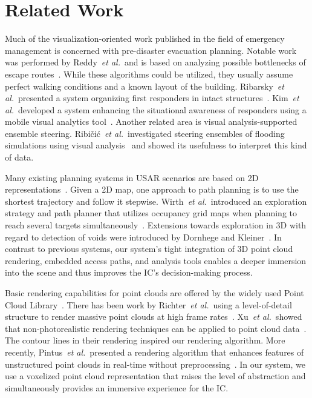 \documentclass[conference,10pt,letter]{IEEEtran}
\def\IC{IC}
\def\etal{\textit{et al.}}
\begin{document}

\section{Related Work} \label{sec:relatedwork}
 Much of the visualization-oriented work published in the field of emergency management is concerned with pre-disaster evacuation planning. Notable work was performed by Reddy~\etal\ and is based on analyzing possible bottlenecks of escape routes~\cite{EuroVA12:13-17:2012}. While these algorithms could be utilized, they usually assume perfect walking conditions and a known layout of the building. Ribarsky~\etal\ presented a system organizing first responders in intact structures~\cite{Ribarsky:2010}. Kim~\etal\ developed a system enhancing the situational awareness of responders using a mobile visual analytics tool~\cite{Kim:2008}. Another related area is visual analysis-supported ensemble steering. Ribi\v{c}i\'c~\etal\ investigated steering ensembles of flooding simulations using visual analysis~\cite{6280550} and showed its usefulness to interpret this kind of data.

Many existing planning systems in USAR scenarios are based on 2D representations~\cite{kleiner_et_al_ssrr09,Pellenz2009SMU}. Given a 2D map, one approach to path planning is to use the shortest trajectory and follow it stepwise. Wirth~\etal\ introduced an exploration strategy and path planner that utilizes occupancy grid maps when planning to reach several targets simultaneously~\cite{Wirth2007ETA1}. Extensions towards exploration in 3D with regard to detection of voids were introduced by Dornhege and Kleiner~\cite{dornhege2011frontier}. In contrast to previous systems, our system's tight integration of 3D point cloud rendering, embedded access paths, and analysis tools enables a deeper immersion into the scene and thus improves the \IC 's decision-making process. 

 Basic rendering capabilities for point clouds are offered by the widely used Point Cloud Library~\cite{Rusu11ICRA}. There has been work by Richter~\etal\ using a level-of-detail structure to render massive point clouds at high frame rates~\cite{Richter:2010:ORV:1811158.1811178}. Xu~\etal\ showed that non-photorealistic rendering techniques can be applied to point cloud data~\cite{conf/npar/XuC04}. The contour lines in their rendering inspired our rendering algorithm. More recently, Pintus~\etal\ presented a rendering algorithm that enhances features of unstructured point clouds in real-time without preprocessing~\cite{Pintus:2011:RRM:2384495.2384513}. In our system, we use a voxelized point cloud representation that raises the level of abstraction and simultaneously provides an immersive experience for the \IC .
\end{document}
